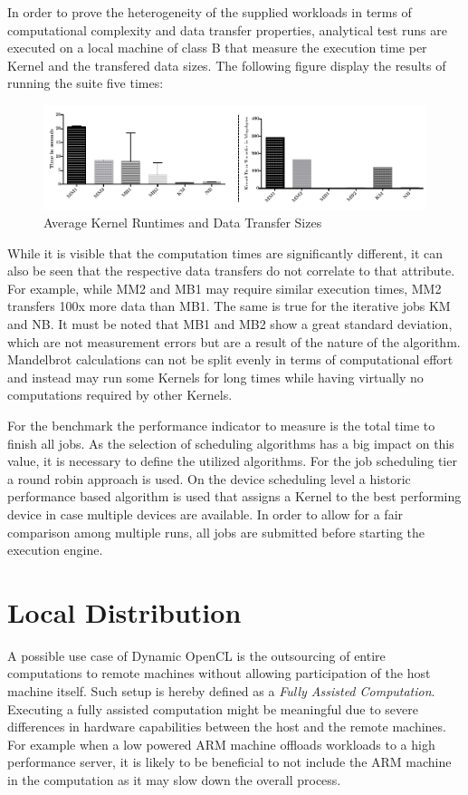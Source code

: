 In order to prove the heterogeneity of the supplied workloads in terms of computational complexity and data transfer properties, analytical test runs are executed on a local machine of class B that measure the execution time per Kernel and the transfered data sizes. The following figure display the results of running the suite five times:

\begin{figure}[H]
	
	\includegraphics[width=1.0\textwidth]{images/benchmark_kernel_data_transfers.pdf}
	\centering
	\caption{Average Kernel Runtimes and Data Transfer Sizes}
	\label{img:benchmark_kernel_attributes}
\end{figure}

While it is visible that the computation times are significantly different, it can also be seen that the respective data transfers do not correlate to that attribute. For example, while MM2 and MB1 may require similar execution times, MM2 transfers 100x more data than MB1. The same is true for the iterative jobs KM and NB. It must be noted that MB1 and MB2 show a great standard deviation, which are not measurement errors but are a result of the nature of the algorithm. Mandelbrot calculations can not be split evenly in terms of computational effort and instead may run some Kernels for long times while having virtually no computations required by other Kernels.

For the benchmark the performance indicator to measure is the total time to finish all jobs. As the selection of scheduling algorithms has a big impact on this value, it is necessary to define the utilized algorithms. For the job scheduling tier a round robin approach is used. On the device scheduling level a historic performance based algorithm is used that assigns a Kernel to the best performing device in case multiple devices are available. In order to allow for a fair comparison among multiple runs, all jobs are submitted before starting the execution engine.

\section{Local Distribution}
\label{local_distribution}
A possible use case of Dynamic OpenCL is the outsourcing of entire computations to remote machines without allowing participation of the host machine itself. Such setup is hereby defined as a \textit{Fully Assisted Computation}. Executing a fully assisted computation might be meaningful due to severe differences in hardware capabilities between the host and the remote machines. For example when a low powered ARM machine offloads workloads to a high performance server, it is likely to be beneficial to not include the ARM machine in the computation as it may slow down the overall process.

